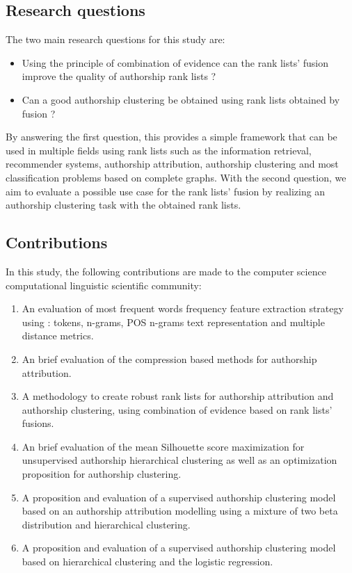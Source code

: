 \subsection{Research questions}

The two main research questions for this study are:

\begin{itemize}
  \item Using the principle of combination of evidence can the rank lists' fusion improve the quality of authorship rank lists ?
  \item Can a good authorship clustering be obtained using rank lists obtained by fusion ?
\end{itemize}

By answering the first question, this provides a simple framework that can be used in multiple fields using rank lists such as the information retrieval, recommender systems, authorship attribution, authorship clustering and most classification problems based on complete graphs.
With the second question, we aim to evaluate a possible use case for the rank lists' fusion by realizing an authorship clustering task with the obtained rank lists.

\subsection{Contributions}

In this study, the following contributions are made to the computer science computational linguistic scientific community:

\begin{enumerate}
  \item An evaluation of most frequent words frequency feature extraction strategy using : tokens, n-grams, POS n-grams text representation and multiple distance metrics.
  \item An brief evaluation of the compression based methods for authorship attribution.
  \item A methodology to create robust rank lists for authorship attribution and authorship clustering, using combination of evidence based on rank lists' fusions.
  \item An brief evaluation of the mean Silhouette score maximization for unsupervised authorship hierarchical clustering as well as an optimization proposition for authorship clustering.
  \item A proposition and evaluation of a supervised authorship clustering model based on an authorship attribution modelling using a mixture of two beta distribution and hierarchical clustering.
  \item A proposition and evaluation of a supervised authorship clustering model based on hierarchical clustering and the logistic regression.
\end{enumerate}

